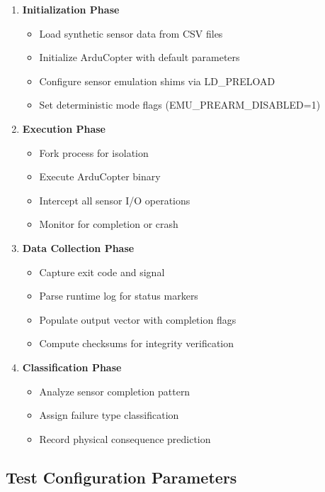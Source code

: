 \documentclass[11pt,a4paper]{article}
\begin{document}
\begin{enumerate}
  \item \textbf{Initialization Phase}
  \begin{itemize}
    \item Load synthetic sensor data from CSV files
    \item Initialize ArduCopter with default parameters
    \item Configure sensor emulation shims via LD\_PRELOAD
    \item Set deterministic mode flags (EMU\_PREARM\_DISABLED=1)
  \end{itemize}
  
  \item \textbf{Execution Phase}
  \begin{itemize}
    \item Fork process for isolation
    \item Execute ArduCopter binary
    \item Intercept all sensor I/O operations
    \item Monitor for completion or crash
  \end{itemize}
  
  \item \textbf{Data Collection Phase}
  \begin{itemize}
    \item Capture exit code and signal
    \item Parse runtime log for status markers
    \item Populate output vector with completion flags
    \item Compute checksums for integrity verification
  \end{itemize}
  
  \item \textbf{Classification Phase}
  \begin{itemize}
    \item Analyze sensor completion pattern
    \item Assign failure type classification
    \item Record physical consequence prediction
  \end{itemize}
\end{enumerate}

\subsection{Test Configuration Parameters}
\end{document}
